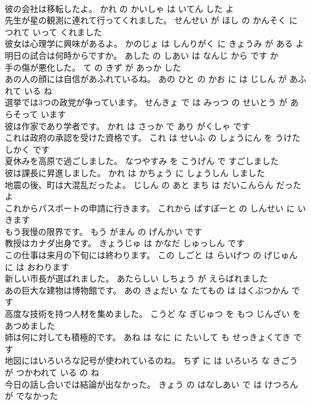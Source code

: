 \documentclass[8pt]{extreport}
\begin{document}
\begin{CJK}{UTF8}{min}
\\	彼の会社は移転したよ。	かれ の かいしゃ は いてん した よ 
\\	先生が星の観測に連れて行ってくれました。	せんせい が ほし の かんそく に つれて いって くれました 
\\	彼女は心理学に興味があるよ。	かのじょ は しんりがく に きょうみ が ある よ 
\\	明日の試合は何時からですか。	あした の しあい は なんじ から です か 
\\	手の傷が悪化した。	て の きず が あっか した 
\\	あの人の顔には自信があふれているね。	あの ひと の かお に は じしん が あふれて いる ね 
\\	選挙では3つの政党が争っています。	せんきょ で は みっつ の せいとう が あらそって います 
\\	彼は作家であり学者です。	かれ は さっか で あり がくしゃ です 
\\	これは政府の承認を受けた資格です。	これ は せいふ の しょうにん を うけた しかく です 
\\	夏休みを高原で過ごしました。	なつやすみ を こうげん で すごしました 
\\	彼は課長に昇進しました。	かれ は かちょう に しょうしん しました 
\\	地震の後、町は大混乱だったよ。	じしん の あと まち は だいこんらん だった よ 
\\	これからパスポートの申請に行きます。	これから ぱすぽーと の しんせい に いきます 
\\	もう我慢の限界です。	もう がまん の げんかい です 
\\	教授はカナダ出身です。	きょうじゅ は かなだ しゅっしん です 
\\	この仕事は来月の下旬には終わります。	この しごと は らいげつ の げじゅん に は おわります 
\\	新しい市長が選ばれました。	あたらしい しちょう が えらばれました 
\\	あの巨大な建物は博物館です。	あの きょだい な たてもの は はくぶつかん です 
\\	高度な技術を持つ人材を集めました。	こうど な ぎじゅつ を もつ じんざい を あつめました 
\\	姉は何に対しても積極的です。	あね は なに に たいして も せっきょくてき です 
\\	地図にはいろいろな記号が使われているのね。	ちず に は いろいろ な きごう が つかわれて いる の ね 
\\	今日の話し合いでは結論が出なかった。	きょう の はなしあい で は けつろん が でなかった 

\end{CJK}
\end{document}
